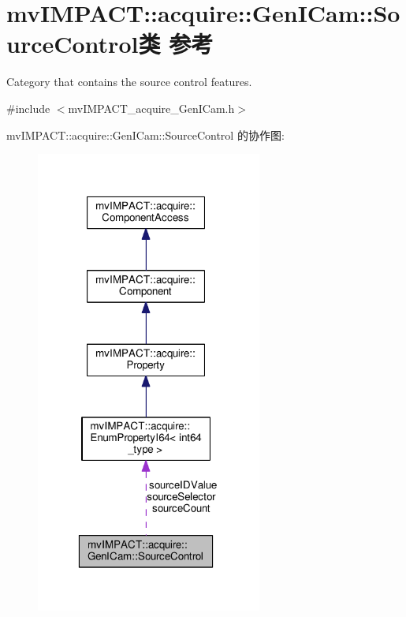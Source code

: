 \hypertarget{classmv_i_m_p_a_c_t_1_1acquire_1_1_gen_i_cam_1_1_source_control}{\section{mv\+I\+M\+P\+A\+C\+T\+:\+:acquire\+:\+:Gen\+I\+Cam\+:\+:Source\+Control类 参考}
\label{classmv_i_m_p_a_c_t_1_1acquire_1_1_gen_i_cam_1_1_source_control}
}


Category that contains the source control features.  




{\ttfamily \#include $<$mv\+I\+M\+P\+A\+C\+T\+\_\+acquire\+\_\+\+Gen\+I\+Cam.\+h$>$}



mv\+I\+M\+P\+A\+C\+T\+:\+:acquire\+:\+:Gen\+I\+Cam\+:\+:Source\+Control 的协作图\+:
\nopagebreak
\begin{figure}[H]
\begin{center}
\leavevmode
\includegraphics[width=211pt]{classmv_i_m_p_a_c_t_1_1acquire_1_1_gen_i_cam_1_1_source_control__coll__graph}
\end{center}
\end{figure}
